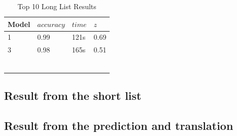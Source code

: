 \begin{table}[th]
    \caption{Top 10 Long List Results}
    \label{tab:result:long}
    \centering
    \begin{tabular}{@{}llll@{}}
    \toprule
    Model & \begin{math}accuracy\end{math} & \begin{math}time\end{math} & \begin{math}z\end{math} \\ \midrule
    1    & 0.99 & 121s                                                      & 0.69                                                  \\
    3    & 0.98 & 165s                                                      & 0.51                                                  \\
         &      &                                                          &                                                       \\
         &      &                                                          &                                                       \\
         &      &                                                          &                                                       \\
         &      &                                                          &                                                       \\
         &      &                                                          &                                                       \\
         &      &                                                          &                                                       \\ \bottomrule
    \end{tabular}
\end{table}

\subsection{Result from the short list}

\subsection{Result from the prediction and translation}

